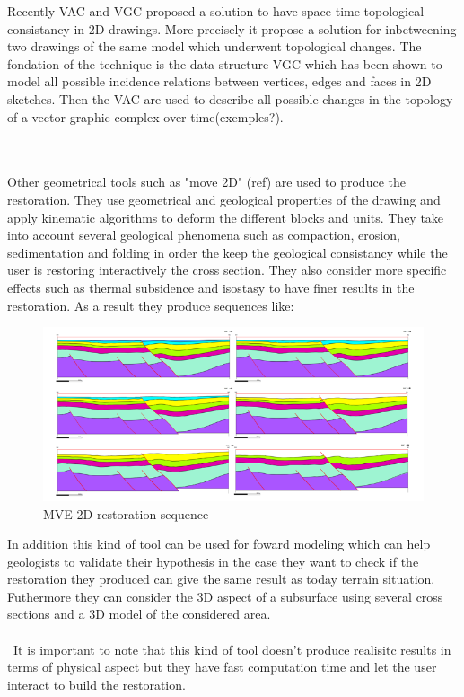 \documentclass[12pt, a4paper]{memoir} %
\begin{document}
Recently VAC and VGC proposed a solution to have space-time topological consistancy in 2D drawings. More precisely it propose a solution for inbetweening two drawings of the same model which underwent topological changes. The fondation of the technique is the data structure VGC which has been shown to model all possible incidence relations between vertices, edges and faces in 2D sketches. Then the VAC are used to describe all possible changes in the topology of a vector graphic complex over time(exemples?).\\\\\

Other geometrical tools such as "move 2D" (ref) are used  to produce the restoration. They use geometrical and geological properties of the drawing and apply kinematic algorithms to deform the different blocks and units. They take into account several geological phenomena such as compaction, erosion, sedimentation and folding in order the keep the geological consistancy while the user is restoring interactively the cross section. They also consider more specific effects such as thermal subsidence and isostasy to have finer results in the restoration. As a result they produce sequences like:

\begin{figure}[H]
	\centering
	\includegraphics[scale=3]{mve2D.png}
	\caption{MVE 2D restoration sequence}
\end{figure}

 In addition this kind of tool can be used for foward modeling which can help geologists to validate their hypothesis in the case they want to check if the restoration they produced can give the same result as today terrain situation. Futhermore they can consider the 3D aspect of a subsurface using several cross sections and a 3D model of the considered area.\\\\\
  It is important to note that this kind of tool doesn't produce realisitc results in terms of physical aspect but they have fast computation time and let the user interact to build the restoration.\\\\\
\end{document}
